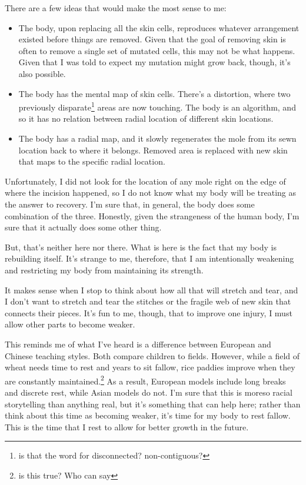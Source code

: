 \documentclass[12pt]{article}
\renewcommand{\,}{\textsuperscript{,}}
\begin{document}
There are a few ideas that would make the most sense to me:  
\begin{itemize}

\item The body, upon replacing all the skin cells, reproduces whatever arrangement existed before things are removed.  
Given that the goal of removing skin is often to remove a single set of mutated cells, this may not be what happens.  
Given that I was told to expect my mutation might grow back, though, it's also possible.

\item The body has the mental map of skin cells. There's a distortion, where two previously disparate\footnote{is that the word for disconnected? non-contiguous?} areas are now touching.  
The body is an algorithm, and so it has no relation between radial location of different skin locations.

\item The body has a radial map, and it slowly regenerates the mole from its sewn location back to where it belongs. Removed area is replaced with new skin that maps to the specific radial location.

\end{itemize}

Unfortunately, I did not look for the location of any mole right on the edge of where the incision happened, so I do not know what my body will be treating as the answer to recovery.  
I'm sure that, in general, the body does some combination of the three.  
Honestly, given the strangeness of the human body, I'm sure that it actually does some other thing.

But, that's neither here nor there.  
What is here is the fact that my body is rebuilding itself.  
It's strange to me, therefore, that I am intentionally weakening and restricting my body from maintaining its strength.

It makes sense when I stop to think about how all that will stretch and tear, and I don't want to stretch and tear the stitches or the fragile web of new skin that connects their pieces.  
It's fun to me, though, that to improve one injury, I must allow other parts to become weaker.

This reminds me of what I've heard is a difference between European and Chinese teaching styles.  
Both compare children to fields.  
However, while a field of wheat needs time to rest and years to sit fallow, rice paddies improve when they are constantly maintained.\footnote{is this true? Who can say}  
As a result, European models include long breaks and discrete rest, while Asian models do not.  
I'm sure that this is moreso racial storytelling than anything real, but it's something that can help here; rather than think about this time as becoming weaker, it's time for my body to rest fallow.  
This is the time that I rest to allow for better growth in the future.
\end{document}
